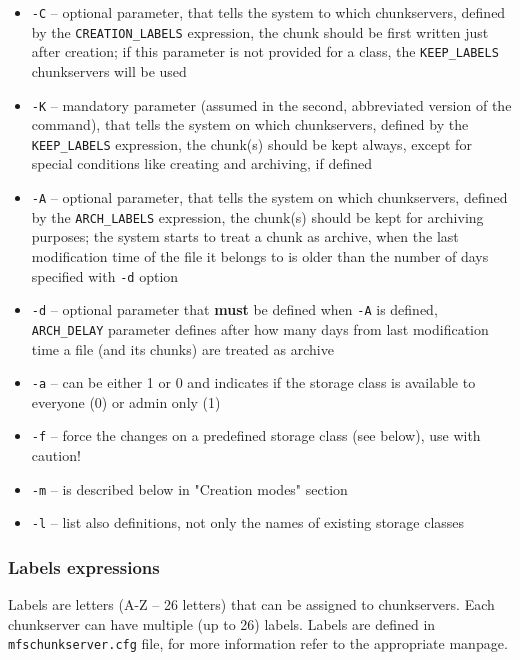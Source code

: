 \documentclass[a4paper,11pt,english]{report}
\def\code#1{\texttt{#1}}
\begin{document}
					\begin{itemize}
		
						\item \code{-C} -- optional parameter, that tells the system to which chunkservers, defined by the \code{CREATION\_LABELS} expression, the chunk should be first written just after creation; if this parameter is not provided for a class, the \code{KEEP\_LABELS} chunkservers will be used
				
						\item \code{-K} -- mandatory parameter (assumed in the second, abbreviated version of the command), that tells the system on which chunkservers, defined by the \code{KEEP\_LABELS} expression, the chunk(s) should be kept always, except for special conditions like creating and archiving, if defined
				
						\item \code{-A} -- optional parameter, that tells the system on which chunkservers, defined by the \code{ARCH\_LABELS} expression, the chunk(s) should be kept for archiving purposes; the system starts to treat a chunk as archive, when the last modification time of the file it belongs to is older than  the  number  of days specified with \code{-d} option
				
						\item \code{-d} -- optional parameter that \textbf{must} be defined when \code{-A} is defined, \code{ARCH\_DELAY} parameter defines after how many days from last modification time a file (and its chunks) are treated as archive
				
						\item \code{-a} -- can be either 1 or 0 and indicates if the storage class is available to everyone (0) or admin only (1)
				
						\item \code{-f} -- force the changes on a predefined storage class (see below), use with caution!
				
						\item \code{-m} -- is described below in "Creation modes" section
				
						\item \code{-l} -- list also definitions, not only the names of existing storage classes			
					
					\end{itemize}
				
				\subsubsection{Labels expressions}
					\label{section:labels-expressions}
					Labels are letters (A-Z -- 26 letters) that can be assigned to chunkservers. Each chunkserver can have multiple (up to 26) labels. Labels are defined in \code{mfschunkserver.cfg} file, for more information refer to the appropriate manpage.
				
\end{document}
